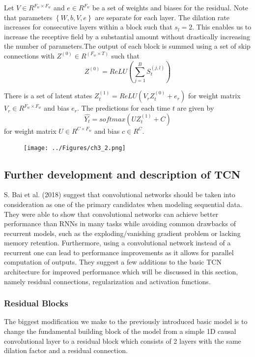 Let $V \in R^{F_w \times F_w}$ and $e \in R^{F_w}$ be a set of weights and biases for the residual. Note that parameters $\left\{W,b,V,e\right\}$ are separate for each layer.
The dilation rate increases for consecutive layers within a block such that $s_l = 2$. This enables us to increase the receptive field by a substantial amount without drastically increasing the number of parameters.The output of each block is summed using a set of skip connections with $Z^{(0)} \in R^{(F_w \times T)}$ such that $$Z^{(0)} = ReLU(\sum_{j=1}^B S_t^{(j,l)})$$

There is a set of latent states $Z_t^{(1)} = ReLU(V_rZ_t^{(0)} + e_r)$ for weight matrix $V_r \in R^{F_w \times F_w}$ and bias $e_r$. The predictions for each time $t$ are given by $$\hat{Y_t} = softmax(UZ_t^{(1)}+C)$$ for weight matrix $U \in R^{C \times F_w}$ and bias $c \in R^C$.

\begin{figure}[H]
    \texttt{[image: ../Figures/ch3\_2.png]}
    \label{fig:dtcn}
\end{figure}

\subsection{Further development and description of TCN}
S. Bai et al. (2018) suggest that convolutional networks should be taken into consideration as one of the primary candidates when modeling sequential data. They were able to show that convolutional networks can achieve better performance than RNNs in many tasks while avoiding common drawbacks of recurrent models, such as the exploding/vanishing gradient problem or lacking memory retention. Furthermore, using a convolutional network instead of a recurrent one can lead to performance improvements as it allows for parallel computation of outputs. They suggest a few additions to the basic TCN architecture for improved performance which will be discussed in this section, namely residual connections, regularization and activation functions.

\subsubsection{Residual Blocks}
The biggest modification we make to the previously introduced basic model is to change the fundamental building block of the model from a simple 1D causal convolutional layer to a residual block which consists of 2 layers with the same dilation factor and a residual connection.

